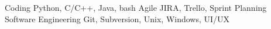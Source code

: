 
\begin{cvskills}

  \cvskill
    {Coding}
    {Python, C/C++, Java, bash}
  \cvskill
    {Agile} %
    {JIRA, Trello, Sprint Planning}
  \cvskill
    {Software Engineering}
    {Git, Subversion, Unix, Windows, UI/UX}

\end{cvskills}
